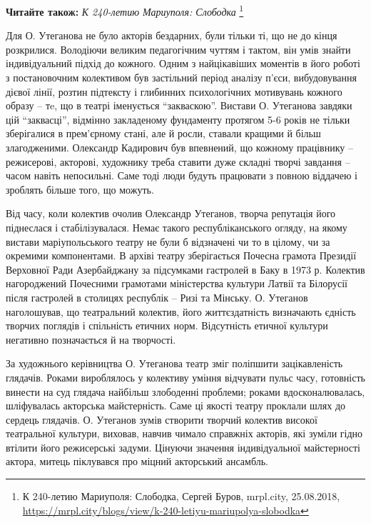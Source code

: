 \textbf{Читайте також:} \emph{К 240-летию Мариуполя: Слободка}%
\footnote{К 240-летию Мариуполя: Слободка, Сергей Буров, mrpl.city, 25.08.2018, \url{https://mrpl.city/blogs/view/k-240-letiyu-mariupolya-slobodka}}


Для О. Утеганова не було акторів бездарних, були тільки ті, що не до кінця
розкрилися. Володіючи великим педагогічним чуттям і тактом, він умів знайти
індивідуальний підхід до кожного. Одним з найцікавіших моментів в його роботі з
постановочним колективом був застільний період аналізу п'єси, вибудовування
дієвої лінії, розтин підтексту і глибинних психологічних мотивувань кожного
образу – тe, що в театрі іменується \enquote{закваскою}. Вистави О. Утеганова завдяки
цій \enquote{заквасці}, відмінно закладеному фундаменту протягом 5-6 років не тільки
зберігалися в прем'єрному стані, але й росли, ставали кращими й більш
злагодженими. Олександр Кадирович був впевнений, що кожному працівнику –
режисерові, акторові, художнику треба ставити дуже складні творчі завдання –
часом навіть непосильні. Саме тоді люди будуть працювати з повною віддачею і
зроблять більше того, що можуть.

Від часу, коли колектив очолив Олександр Утеганов, творча репутація його
піднеслася і стабілізувалася. Немає такого республіканського огляду, на якому
вистави маріупольського театру не були б відзначені чи то в цілому, чи за
окремими компонентами. В архіві театру зберігається Почесна грамота Президії
Верховної Ради Азербайджану за підсумками гастролей в Баку в 1973 р. Колектив
нагороджений Почесними грамотами міністерства культури Латвії та Білорусії
після гастролей в столицях республік – Ризі та Мінську. О. Утеганов
наголошував, що театральний колектив, його життєздатність визначають єдність
творчих поглядів і спільність етичних норм. Відсутність етичної культури
негативно позначається й на творчості.

За художнього керівництва О. Утеганова театр зміг поліпшити зацікавленість
глядачів. Роками вироблялось у колективу уміння відчувати пульс часу,
готовність винести на суд глядача найбільш злободенні проблеми; роками
вдосконалювалась, шліфувалась акторська майстерність. Саме ці якості театру
проклали шлях до сердець глядачів. О. Утеганов зумів створити творчий колектив
високої театральної культури, виховав, навчив чимало справжніх акторів, які
зуміли гідно втілити його режисерські задуми. Цінуючи значення індивідуальної
майстерності актора, митець піклувався про міцний акторський ансамбль.

